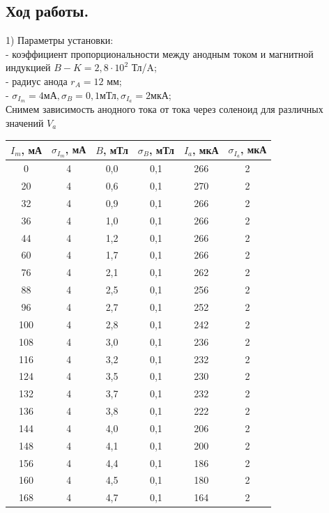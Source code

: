 \documentclass{article}
\begin{document}
\subsection*{Ход работы.}
1) Параметры установки: \\
-   коэффициент пропорциональности между анодным током и магнитной индукцией \(B - K = 2,8 \cdot 10^{2}\) Тл/A; \\
-   радиус анода \(r_{A} = 12\) мм; \\
-   \(\sigma_{I_{m}} = 4 \text{мА}, \sigma_{B} = 0,1 \text{мТл}, \sigma_{I_{a}} = 2 \text{мкА}\); \\
Снимем зависимость анодного тока от тока через соленоид для различных значений \(V_{a}\)

\begin{center}
\begin{tabular}{|c|c|c|c|c|c|}
\hline
$I_m$, мА & $\sigma_{I_m}$, мА & $B$, мТл & $\sigma_B$, мТл & $I_a$, мкА & $\sigma_{I_a}$, мкА \\ \hline
0 & 4 & 0,0 & 0,1 & 266 & 2 \\ \hline
20 & 4 & 0,6 & 0,1 & 270 & 2 \\ \hline
32 & 4 & 0,9 & 0,1 & 266 & 2 \\ \hline
36 & 4 & 1,0 & 0,1 & 266 & 2 \\ \hline
44 & 4 & 1,2 & 0,1 & 266 & 2 \\ \hline
60 & 4 & 1,7 & 0,1 & 266 & 2 \\ \hline
76 & 4 & 2,1 & 0,1 & 262 & 2 \\ \hline
88 & 4 & 2,5 & 0,1 & 256 & 2 \\ \hline
96 & 4 & 2,7 & 0,1 & 252 & 2 \\ \hline
100 & 4 & 2,8 & 0,1 & 242 & 2 \\ \hline
108 & 4 & 3,0 & 0,1 & 236 & 2 \\ \hline
116 & 4 & 3,2 & 0,1 & 232 & 2 \\ \hline
124 & 4 & 3,5 & 0,1 & 230 & 2 \\ \hline
132 & 4 & 3,7 & 0,1 & 232 & 2 \\ \hline
136 & 4 & 3,8 & 0,1 & 222 & 2 \\ \hline
144 & 4 & 4,0 & 0,1 & 206 & 2 \\ \hline
148 & 4 & 4,1 & 0,1 & 200 & 2 \\ \hline
156 & 4 & 4,4 & 0,1 & 186 & 2 \\ \hline
160 & 4 & 4,5 & 0,1 & 180 & 2 \\ \hline
168 & 4 & 4,7 & 0,1 & 164 & 2 \\ \hline

\end{tabular}
\end{center}
\end{document}
